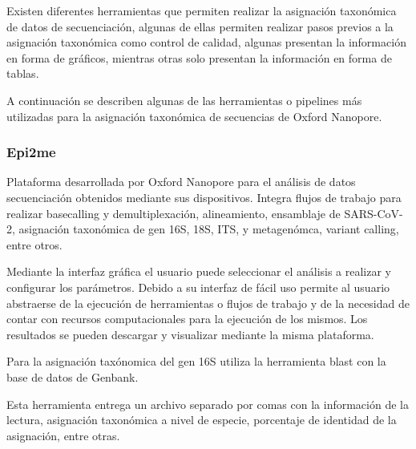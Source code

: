 Existen diferentes herramientas que permiten realizar la asignación taxonómica de datos de secuenciación, algunas de ellas permiten realizar pasos previos a la asignación taxonómica como control de calidad, algunas presentan la información en forma de gráficos, mientras otras solo presentan la información en forma de tablas.

A continuación se describen algunas de las herramientas o pipelines más utilizadas para la asignación taxonómica de secuencias de Oxford Nanopore.
\subsubsection{Epi2me}
Plataforma desarrollada por Oxford Nanopore para el análisis de datos secuenciación obtenidos mediante sus dispositivos. 
Integra flujos de trabajo para realizar basecalling y demultiplexación, alineamiento, ensamblaje de SARS-CoV-2, asignación taxonómica de gen 16S, 18S, ITS, y metagenómca, variant calling, entre otros.

Mediante la interfaz gráfica el usuario puede seleccionar el análisis a realizar y configurar los parámetros. Debido a su interfaz de fácil uso permite al usuario abstraerse de la ejecución de herramientas o flujos de trabajo y de la necesidad de contar con recursos computacionales para la ejecución de los mismos.
Los resultados se pueden descargar y visualizar mediante la misma plataforma.


Para la asignación taxónomica del gen 16S utiliza la herramienta blast con la base de datos de Genbank.

Esta herramienta entrega un archivo separado por comas con la información de la lectura, asignación taxonómica a nivel de especie, porcentaje de identidad de la asignación, entre otras.

